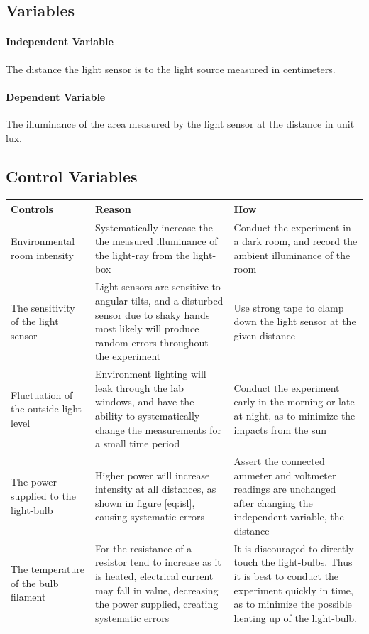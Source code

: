 \documentclass[a4paper,12pt]{article}
\begin{document}
\subsection{Variables}
\paragraph{Independent Variable}
The distance the light sensor is to the light source measured in centimeters.

\paragraph{Dependent Variable}
The illuminance of the area measured by the light sensor at the distance in unit lux.

\subsection{Control Variables}

\begin{longtable}{P{0.2\textwidth}|P{0.35\textwidth}|P{0.35\textwidth}}
Controls & Reason & How\\\hline
Environmental room intensity & Systematically increase the the measured illuminance of the light-ray from the light-box & Conduct the experiment in a dark room, and record the ambient illuminance of the room \\
The sensitivity of the light sensor & Light sensors are sensitive to angular tilts, and a disturbed sensor due to shaky hands most likely will produce random errors throughout the experiment & Use strong tape to clamp down the light sensor at the given distance\\
Fluctuation of the outside light level & Environment lighting will leak through the lab windows, and have the ability to systematically change the measurements for a small time period & Conduct the experiment early in the morning or late at night, as to minimize the impacts from the sun\\
The power supplied to the light-bulb & Higher power will increase intensity at all distances, as shown in figure \ref{eq:isl}, causing systematic errors & Assert the connected ammeter and voltmeter readings are unchanged after changing the independent variable, the distance\\
The temperature of the bulb filament & For the resistance of a resistor tend to increase as it is heated, electrical current may fall in value, decreasing the power supplied, creating systematic errors & It is discouraged to directly touch the light-bulbs. Thus it is best to conduct the experiment quickly in time, as to minimize the possible heating up of the light-bulb.

\end{longtable}
\end{document}
